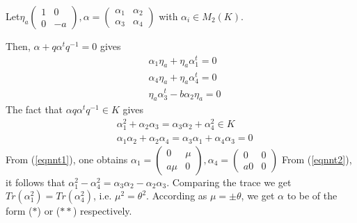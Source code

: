 \begin{Proof}
Let\pageoriginale $\eta_a\begin{pmatrix}
1 & 0\\
0 & -a
\end{pmatrix}, \alpha=\begin{pmatrix}
\alpha_1 & \alpha_2\\
\alpha_3 & \alpha_4
\end{pmatrix}$ with $\alpha_i\in M_2(K)$.

Then, $\alpha+q\alpha^{t}q^{-1}=0$ gives 
\begin{equation*}\label{eqnnt1}
\begin{aligned}
&\alpha_1\eta_a+\eta_a\alpha^{t}_1=0\\
&{}\alpha_4\eta_a+\eta_a\alpha^{t}_4=0\\
&{}\eta_a\alpha^{t}_3-b\alpha_2\eta_a=0
\end{aligned}\tag{1}
\end{equation*}
The fact that $\alpha q\alpha^{t}q^{-1}\in K$ gives 
\begin{equation*}\label{eqnnt2}
\begin{aligned}
&\alpha^{2}_1+\alpha_2\alpha_3=\alpha_3\alpha_2+\alpha^{2}_4\in K\\
&{}\alpha_1\alpha_2+\alpha_2\alpha_4=\alpha_3\alpha_1+\alpha_4\alpha_3=0
\end{aligned}\tag{2}
\end{equation*}
From (\ref{eqnnt1}), one obtains $\alpha_1=\begin{pmatrix}
0 & \mu\\
a\mu & 0
\end{pmatrix}, \alpha_4=\begin{pmatrix}
0 & 0\\
a0 & 0
\end{pmatrix}$
From (\ref{eqnnt2}), it follows that $\alpha^{2}_1-\alpha^{2}_4=\alpha_3\alpha_2-\alpha_2 \alpha_3$. Comparing the trace we get $Tr\left(\alpha^{2}_1\right)=Tr(\alpha^{2}_{4})$, i.e. $\mu^{2}=\theta^{2}$. According as $\mu=\pm \theta$, we get $\alpha$ to be of the form ($\ast$) or ($\ast\ast$) respectively. 
\end{Proof}

